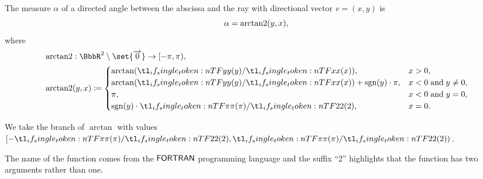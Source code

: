 \begin{proposition}\label{thm:arctantwo}
  The measure \( \alpha \) of a directed angle between the abscissa and the ray with directional vector \( v = (x, y) \) is
  \begin{equation}
    \alpha = \operatorname{arctan2}(y, x),
  \end{equation}
  where
  \begin{equation*}
    \begin{aligned}
       &\arctantwo: \BbbR^2 \setminus \set{ \vect 0 } \to [-\pi, \pi), \\
       &\arctantwo(y, x) \coloneqq \begin{cases}
        \arctan(\ifrac y x),                     &x > 0, \\
        \arctan(\ifrac y x) + \sgn(y) \cdot \pi, &x < 0 \T{and} y \neq 0, \\
        \pi,                                     &x < 0 \T{and} y = 0, \\
        \sgn(y) \cdot \ifrac \pi 2,              &x = 0. \\
      \end{cases}
    \end{aligned}
  \end{equation*}

  We take the branch of \( \arctan \) with values \( [-\ifrac \pi 2, \ifrac \pi 2) \).

  The name of the function comes from the \( \textsf{FORTRAN} \) programming language and the suffix \enquote{2} highlights that the function has two arguments rather than one.
\end{proposition}
